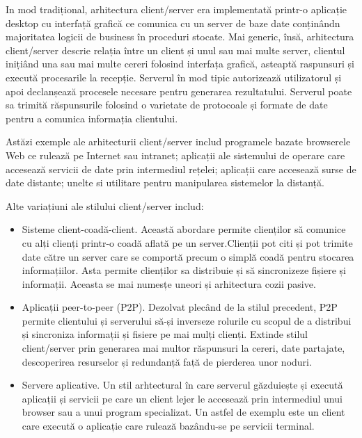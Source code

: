 \documentclass[12pt, a4paper, oneside, romanian]{teza-upb}
\begin{document}
In mod tradițional, arhitectura client/server era implementată printr-o aplicație desktop cu interfață grafică ce comunica cu un server de baze date conținândn majoritatea logicii de business în proceduri stocate. Mai generic, însă, arhitectura client/server descrie relația între un client și unul sau mai multe server, clientul inițiând una sau mai multe cereri folosind interfața grafică, asteaptă raspunsuri și execută procesarile la recepție. Serverul în mod tipic autorizează utilizatorul și apoi declanșează procesele necesare pentru generarea rezultatului. Serverul poate sa trimită răspunsurile folosind o varietate de protocoale și formate de date pentru a comunica informația clientului.

Astăzi exemple ale arhitecturii client/server includ programele bazate browserele Web ce rulează pe Internet sau intranet; aplicații ale sistemului de operare care accesează servicii de date prin intermediul rețelei; aplicații care accesează surse de date distante; unelte si utilitare pentru manipularea sistemelor la distanță.

Alte variațiuni ale stilului client/server includ:

\begin{itemize}
 \item Sisteme client-coadă-client. Această abordare permite clienților să comunice cu alți clienți printr-o coadă aflată pe un server.Clienții pot citi și pot trimite date către un server care se comportă precum o simplă coadă pentru stocarea informațiilor. Asta permite clienților sa distribuie și să sincronizeze fișiere și informații. Aceasta se mai numesțe uneori și arhitectura cozii pasive.
 \item Aplicații peer-to-peer (P2P). Dezolvat plecând de la stilul precedent, P2P permite clientului și serverului să-și inverseze rolurile cu scopul de a distribui și sincroniza informații și fisiere pe mai mulți clienți. Extinde stilul client/server prin generarea mai multor răspunsuri la cereri, date partajate, descoperirea resurselor și redundanță față de pierderea unor noduri.
 \item Servere aplicative. Un stil arhtectural în care serverul găzduiește și execută aplicații și servicii pe care un client lejer le accesează prin intermediul unui browser sau a unui program specializat. Un astfel de exemplu este un client care execută o aplicație care rulează bazându-se pe servicii terminal.
\end{itemize}
\end{document}
